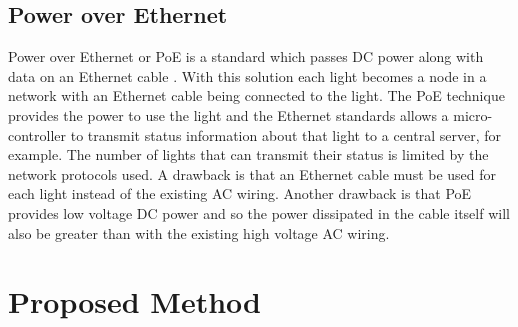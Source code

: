 		\subsection{Power over Ethernet}

		Power over Ethernet or PoE is a standard which passes DC power along with data on an Ethernet cable \cite{patoka2003power}.
		With this solution each light becomes a node in a network with an Ethernet cable being connected to the light.
		The PoE technique provides the power to use the light and the Ethernet standards allows a micro-controller to transmit status information about that light to a central server, for example.
		The number of lights that can transmit their status is limited by the network protocols used.
		A drawback is that an Ethernet cable must be used for each light instead of the existing AC wiring.
		Another drawback is that PoE provides low voltage DC power and so the power dissipated in the cable itself will also be greater than with the existing high voltage AC wiring.




	\section{Proposed Method}

